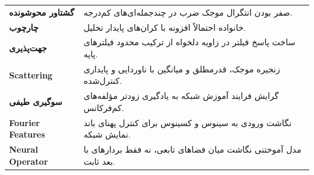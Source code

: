 \documentclass[12pt,openany,oneside]{book}
\begin{document}
\begin{longtable}{>{\bfseries}p{}p{}}
گشتاور محوشونده & صفر بودن انتگرال موجک ضرب در چندجمله‌ای‌های کم‌درجه.\\
چارچوب & خانواده احتمالاً افزونه با کران‌های پایدار تحلیل.\\
جهت‌پذیری & ساخت پاسخ فیلتر در زاویه دلخواه از ترکیب محدود فیلترهای پایه.\\
Scattering & زنجیره موجک، قدرمطلق و میانگین با ناوردایی و پایداری کنترل‌شده.\\
سوگیری طیفی & گرایش فرایند آموزش شبکه به یادگیری زودتر مؤلفه‌های کم‌فرکانس.\\
Fourier Features & نگاشت ورودی به سینوس و کسینوس برای کنترل پهنای باند نمایش شبکه.\\
Neural Operator & مدل آموختنی نگاشت میان فضاهای تابعی، نه فقط بردارهای با بعد ثابت.\\
\bottomrule
\end{longtable}
\end{document}

